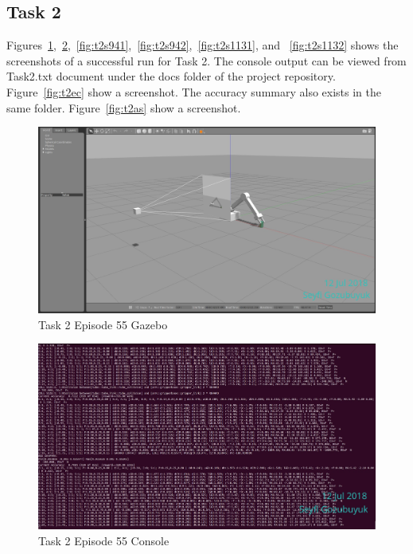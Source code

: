 \documentclass[10pt,journal,compsoc]{IEEEtran}
\begin{document}
\subsection{Task 2}
Figures~\ref{fig:t2s551},~\ref{fig:t2s552},~\ref{fig:t2s941},~\ref{fig:t2s942},~\ref{fig:t2s1131}, and ~\ref{fig:t2s1132} shows the screenshots of a successful run for Task 2. The console output can be viewed from Task2.txt document under the docs folder of the project repository\cite{git:t2c}. Figure~\ref{fig:t2ec} show a screenshot. The accuracy summary also exists in the same folder\cite{git:t2a}. Figure~\ref{fig:t2as} show a screenshot.
\begin{figure}[thpb]
      \centering
      \includegraphics[width=\linewidth]{figures/Task2_Step55_1.png}
      \caption{Task 2 Episode 55 Gazebo}
      \label{fig:t2s551}
\end{figure}

\begin{figure}[thpb]
      \centering
      \includegraphics[width=\linewidth]{figures/Task2_Step55_2.png}
      \caption{Task 2 Episode 55 Console}
      \label{fig:t2s552}
\end{figure}
\end{document}
